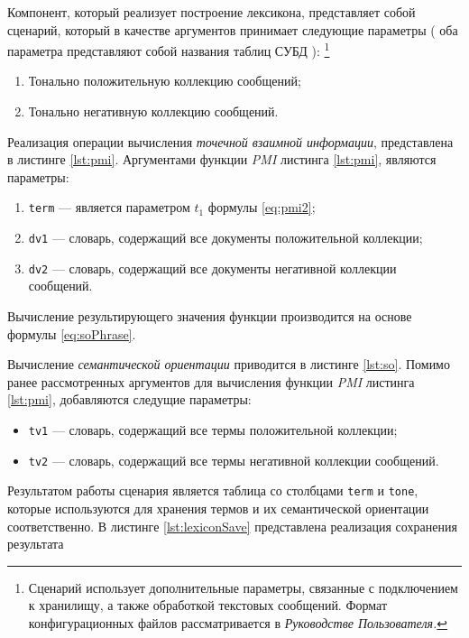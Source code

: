     Компонент, который реализует построение лексикона, представляет собой
    сценарий, который в качестве аргументов принимает следующие параметры
    (
        оба параметра представляют собой названия таблиц СУБД
    ):
    \footnote{Сценарий использует дополнительные параметры, связанные
    с подключением к хранилищу, а также обработкой текстовых сообщений.
    Формат конфигурационных файлов рассматривается в {\it Руководстве
    Пользователя.}}

    \begin{enumerate}
        \item Тонально положительную коллекцию сообщений;
        \item Тонально негативную коллекцию сообщений.
    \end{enumerate}

    Реализация операции вычисления {\it точечной взаимной информации},
    представлена в листинге \ref{lst:pmi}.
    Аргументами функции {\it PMI} листинга \ref{lst:pmi}, являются параметры:
    \begin{enumerate}
        \item {\tt term} --- является параметром $t_1$
            формулы \ref{eq:pmi2};
        \item {\tt dv1} --- словарь, содержащий все документы положительной коллекции;
        \item {\tt dv2} --- словарь, содержащий все документы негативной коллекции сообщений.
    \end{enumerate}

    Вычисление результирующего значения функции производится на основе формулы \ref{eq:soPhrase}.

    \lstset{style=python}
    

    Вычисление {\it семантической ориентации} приводится в листинге \ref{lst:so}.
    Помимо ранее рассмотренных аргументов для вычисления функции {\it PMI}
    листинга \ref{lst:pmi}, добавляются следущие параметры:
    \begin{itemize}
        \item {\tt tv1} --- словарь, содержащий все термы положительной коллекции;
        \item {\tt tv2} --- словарь, содержащий все термы негативной коллекции сообщений.
    \end{itemize}

    \lstset{style=python}
    

        Результатом работы сценария является таблица со столбцами {\tt term}
    и {\tt tone}, которые используются для хранения термов и их семантической
    ориентации соответственно.
    В листинге \ref{lst:lexiconSave} представлена реализация сохранения результата

    \lstset{style=python}
    
